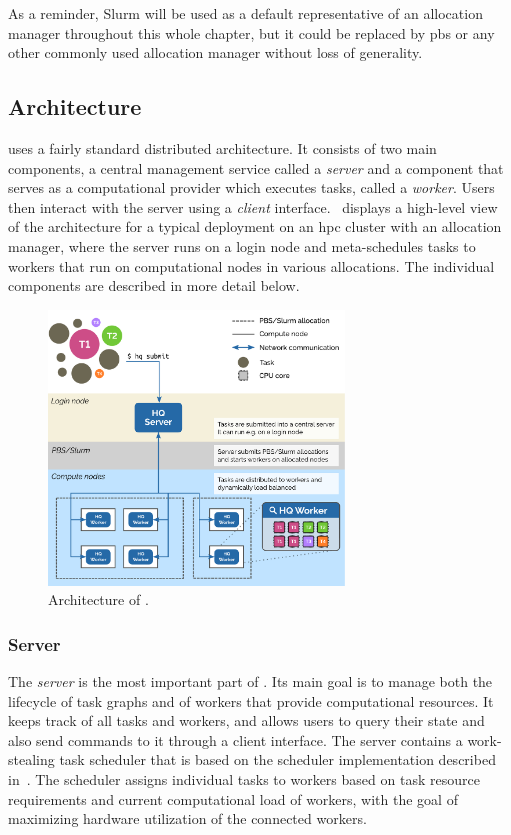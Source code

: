 As a reminder, Slurm will be used as a default representative of an allocation manager throughout
this whole chapter, but it could be replaced by \gls{pbs} or any other commonly used
allocation manager without loss of generality.

\subsection{Architecture}
\label{hq:architecture}
\hyperqueue{} uses a fairly standard distributed architecture. It consists of two main
components, a central management service called a \emph{server} and a component that
serves as a computational provider which executes tasks, called a \emph{worker}. Users
then interact with the server using a \emph{client} interface.~
displays a high-level view of the \hq{} architecture for a typical deployment on
an \gls{hpc} cluster with an allocation manager, where the server runs on a login
node and meta-schedules tasks to workers that run on computational nodes in various allocations.
The individual components are described in more detail below.

\begin{figure}[h]
	\centering
	\includegraphics[width=0.7\textwidth]{imgs/hq/architecture}
	\caption{Architecture of \hyperqueue{}.}
	\label{fig:hq-architecture}
\end{figure}

\subsubsection*{Server}
The \emph{server} is the most important part of \hyperqueue{}. Its main goal is
to manage both the lifecycle of task graphs and of workers that provide computational resources. It
keeps track of all tasks and workers, and allows users to query their state and also send commands
to it through a client interface. The server contains a work-stealing task scheduler that is based
on the \rsds{} scheduler implementation described in~. The
scheduler assigns individual tasks to workers based on task resource requirements and current
computational load of workers, with the goal of maximizing hardware utilization of the connected
workers.

